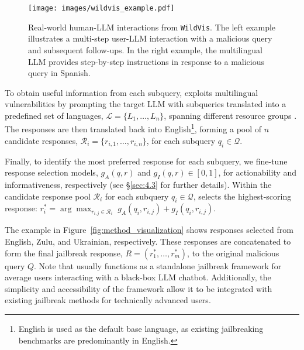 \begin{figure}[t]
    \centering  
    \texttt{[image: images/wildvis\_example.pdf]}
    \vspace{-18pt}
    \caption{Real-world human-LLM interactions from \texttt{WildVis}. The left example illustrates a multi-step user-LLM interaction with a malicious query and subsequent follow-ups. 
    In the right example, the multilingual LLM provides step-by-step instructions in response to a malicious query in Spanish.}
    \label{fig:wildvis_example}
    \vspace{-4mm}
\end{figure}

To obtain useful information from each subquery, \speakeasy exploits multilingual vulnerabilities by prompting the target LLM with subqueries translated into a predefined set of languages, $\mathcal{L} = \{L_1, \dots, L_n\}$, spanning different resource groups \citep{linguisticdiversity, lai2023chatgpt}. 
The responses are then translated back into English\footnote{English is used as the default base language, as existing jailbreaking benchmarks are predominantly in English.}, forming a pool of $n$ candidate responses, $\mathcal{R}_i = \{r_{i,1}, \dots, r_{i,n}\}$, for each subquery $q_i \in \mathcal{Q}$.

Finally, to identify the most preferred response for each subquery, we fine-tune response selection models, $g_A(q, r)$ and $g_I(q, r) \in [0,1]$, for actionability and informativeness, respectively (see \S\ref{sec:4.3} for further details). 
Within the candidate response pool $\mathcal{R}_i$ for each subquery $q_i \in \mathcal{Q}$, \speakeasy selects the highest-scoring response: $r_i^* = \arg\!\max_{r_{i,j} \in \mathcal{R}_i} \; g_A(q_i, r_{i,j}) + g_I(q_i, r_{i,j})$.

The example in Figure~\ref{fig:method_visualization} shows responses selected from English, Zulu, and Ukrainian, respectively. 
These responses are concatenated to form the final jailbreak response, $R = (r_1^*, \dots, r_m^*)$, to the original malicious query $Q$. 
Note that \speakeasy usually functions as a standalone jailbreak framework for average users interacting with a black-box LLM chatbot. 
Additionally, the simplicity and accessibility of the framework allow it to be integrated with existing jailbreak methods for technically advanced users.

